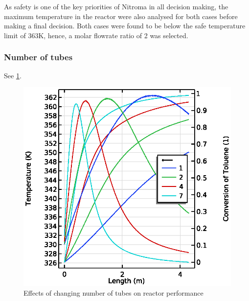 As safety is one of the key priorities of Nitroma in all decision making, the maximum temperature in the reactor were also analysed for both cases before making a final decision. Both cases were found to be below the safe temperature limit of 363K, hence, a molar flowrate ratio of 2 was selected.

\subsubsection{Number of tubes}

See \cref{fig:S5-T-X}.

\begin{figure}[h]
    \centering
    \begin{minipage}{0.49\linewidth}
        \includegraphics[width=\linewidth]{figures/S5-T-X.eps}
        \caption{Effects of changing number of tubes on reactor performance}
        \label{fig:S5-T-X}
    \end{minipage}
    \begin{minipage}{0.49\linewidth}

\end{minipage}
\end{figure}
